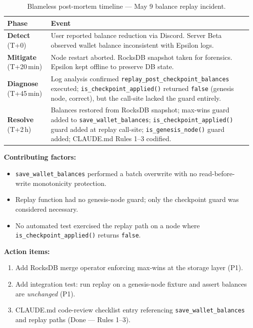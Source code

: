 \documentclass[12pt,a4paper]{article}
\begin{document}
\begin{table}[H]
\centering
\small
\begin{tabularx}{\linewidth}{lX}
\toprule
\textbf{Phase} & \textbf{Event} \\
\midrule
\textbf{Detect} (T+0) &
  User reported balance reduction via Discord.
  Server Beta observed wallet balance inconsistent with Epsilon logs. \\
\rowcolor{rowgray}
\textbf{Mitigate} (T+20\,min) &
  Node restart aborted. RocksDB snapshot taken for forensics.
  Epsilon kept offline to preserve DB state. \\
\textbf{Diagnose} (T+45\,min) &
  Log analysis confirmed \texttt{replay\_post\_checkpoint\_balances} executed;
  \texttt{is\_checkpoint\_applied()} returned \texttt{false} (genesis node,
  correct), but the call-site lacked the guard entirely. \\
\rowcolor{rowgray}
\textbf{Resolve} (T+2\,h) &
  Balances restored from RocksDB snapshot; max-wins guard added to
  \texttt{save\_wallet\_balances}; \texttt{is\_checkpoint\_applied()} guard
  added at replay call-site; \texttt{is\_genesis\_node()} guard added;
  CLAUDE.md Rules 1--3 codified. \\
\bottomrule
\end{tabularx}
\caption{Blameless post-mortem timeline --- May 9 balance replay incident.}
\end{table}

\textbf{Contributing factors:}
\begin{itemize}[leftmargin=*,itemsep=1pt]
  \item \texttt{save\_wallet\_balances} performed a batch overwrite with no
    read-before-write monotonicity protection.
  \item Replay function had no genesis-node guard; only the checkpoint guard
    was considered necessary.
  \item No automated test exercised the replay path on a node where
    \texttt{is\_checkpoint\_applied()} returns \texttt{false}.
\end{itemize}

\textbf{Action items:}
\begin{enumerate}[leftmargin=*,itemsep=1pt]
  \item Add RocksDB merge operator enforcing max-wins at the storage layer (P1).
  \item Add integration test: run replay on a genesis-node fixture and assert
    balances are \emph{unchanged} (P1).
  \item CLAUDE.md code-review checklist entry referencing
    \texttt{save\_wallet\_balances} and replay paths (Done --- Rules 1--3).
\end{enumerate}
\end{document}
